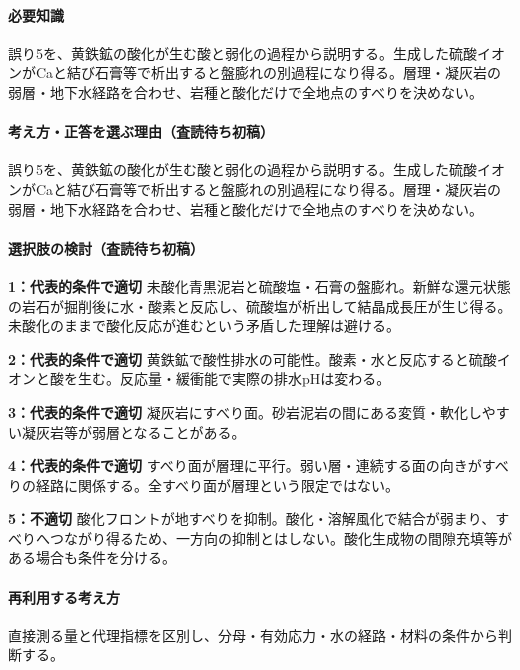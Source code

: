 \paragraph{必要知識} 誤り5を、黄鉄鉱の酸化が生む酸と弱化の過程から説明する。生成した硫酸イオンがCaと結び石膏等で析出すると盤膨れの別過程になり得る。層理・凝灰岩の弱層・地下水経路を合わせ、岩種と酸化だけで全地点のすべりを決めない。

\paragraph{考え方・正答を選ぶ理由（査読待ち初稿）} 誤り5を、黄鉄鉱の酸化が生む酸と弱化の過程から説明する。生成した硫酸イオンがCaと結び石膏等で析出すると盤膨れの別過程になり得る。層理・凝灰岩の弱層・地下水経路を合わせ、岩種と酸化だけで全地点のすべりを決めない。

\paragraph{選択肢の検討（査読待ち初稿）}\mbox{}\par

\noindent\textbf{1：代表的条件で適切} 未酸化青黒泥岩と硫酸塩・石膏の盤膨れ。新鮮な還元状態の岩石が掘削後に水・酸素と反応し、硫酸塩が析出して結晶成長圧が生じ得る。未酸化のままで酸化反応が進むという矛盾した理解は避ける。\par

\noindent\textbf{2：代表的条件で適切} 黄鉄鉱で酸性排水の可能性。酸素・水と反応すると硫酸イオンと酸を生む。反応量・緩衝能で実際の排水pHは変わる。\par

\noindent\textbf{3：代表的条件で適切} 凝灰岩にすべり面。砂岩泥岩の間にある変質・軟化しやすい凝灰岩等が弱層となることがある。\par

\noindent\textbf{4：代表的条件で適切} すべり面が層理に平行。弱い層・連続する面の向きがすべりの経路に関係する。全すべり面が層理という限定ではない。\par

\noindent\textbf{5：不適切} 酸化フロントが地すべりを抑制。酸化・溶解風化で結合が弱まり、すべりへつながり得るため、一方向の抑制とはしない。酸化生成物の間隙充填等がある場合も条件を分ける。\par

\paragraph{再利用する考え方} 直接測る量と代理指標を区別し、分母・有効応力・水の経路・材料の条件から判断する。

